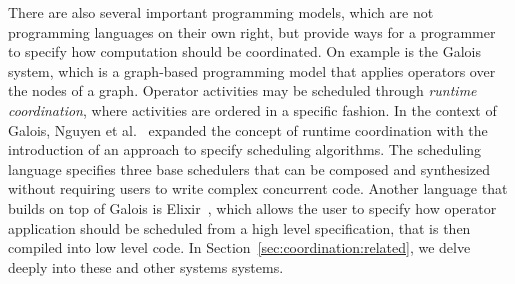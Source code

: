 There are also several important programming models, which are not programming
languages on their own right, but provide ways for a programmer to specify how
computation should be coordinated. On example is the
Galois~\cite{Pingali:2011:TPA:1993316.1993501} system, which is a graph-based
programming model that applies operators over the nodes of a graph. Operator
activities may be scheduled through \emph{runtime coordination}, where
activities are ordered in a specific fashion. In the context of Galois, Nguyen
et al.~\cite{nguyen11} expanded the concept of runtime coordination with the
introduction of an approach to specify scheduling algorithms. The scheduling
language specifies three base schedulers that can be composed and synthesized
without requiring users to write complex concurrent code.  Another language that
builds on top of Galois is Elixir~\cite{Prountzos:2012:ESS:2384616.2384644},
which allows the user to specify how operator application should be scheduled
from a high level specification, that is then compiled into low level code. In
Section~\ref{sec:coordination:related}, we delve deeply into these and other
systems systems.
